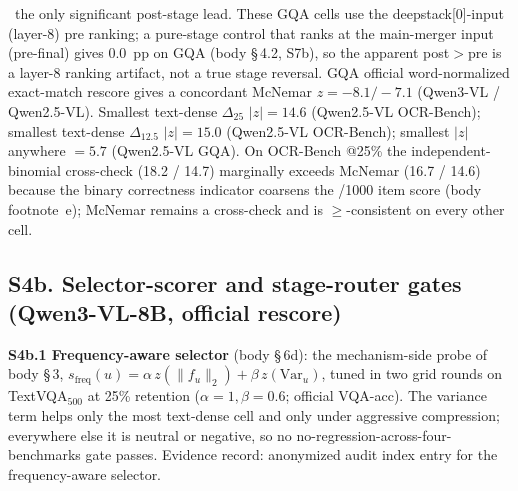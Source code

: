 \documentclass[journal]{IEEEtran}
\begin{document}
\noindent\dag\ the only significant post-stage lead. These GQA cells use the
deepstack[0]-input (layer-8) pre ranking; a pure-stage control that ranks at
the main-merger input (pre-final) gives $0.0$~pp on GQA (body \S\,4.2,
S7b), so the apparent post$>$pre is a layer-8 ranking artifact, not a true
stage reversal. GQA official
word-normalized exact-match rescore gives a concordant McNemar $z = -8.1 / -7.1$
(Qwen3-VL / Qwen2.5-VL). Smallest text-dense $\Delta_{25}$ $|z| = 14.6$
(Qwen2.5-VL OCR-Bench); smallest text-dense $\Delta_{12.5}$ $|z| = 15.0$
(Qwen2.5-VL OCR-Bench); smallest $|z|$ anywhere $= 5.7$ (Qwen2.5-VL GQA). On
OCR-Bench @25\% the independent-binomial cross-check (18.2 / 14.7) marginally
exceeds McNemar (16.7 / 14.6) because the binary correctness indicator coarsens
the /1000 item score (body footnote~e); McNemar remains a cross-check and is
$\geq$-consistent on every other cell.

\subsection*{S4b. Selector-scorer and stage-router gates (Qwen3-VL-8B, official rescore)}

\noindent\textbf{S4b.1 Frequency-aware selector} (body \S\,6d): the
mechanism-side probe of body \S\,3, $s_{\mathrm{freq}}(u) = \alpha\,
z(\|f_u\|_2) + \beta\, z(\mathrm{Var}_u)$, tuned in two grid rounds on
TextVQA$_{500}$ at 25\% retention ($\alpha{=}1,\beta{=}0.6$; official VQA-acc).
The variance term helps only the most text-dense cell and only under aggressive
compression; everywhere else it is neutral or negative, so no
no-regression-across-four-benchmarks gate passes. Evidence record: anonymized
audit index entry for the frequency-aware selector.
\end{document}
